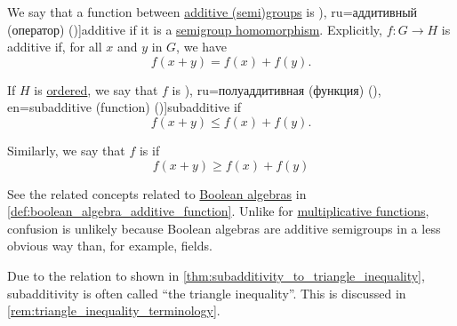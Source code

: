 \begin{definition}\label{def:additive_function}\mimprovised
  We say that a function between \hyperref[def:additive_semigroup]{additive (semi)groups} is \term[en=additive (function) (\cite[\S 8.17]{Schechter1997AnalysisHandbook}), ru=аддитивный (оператор) (\cite[395]{Хелемский2014ФункциональныйАнализ})]{additive} if it is a \hyperref[def:semigroup/morphism]{semigroup homomorphism}. Explicitly, \( f: G \to H \) is additive if, for all \( x \) and \( y \) in \( G \), we have
  \begin{equation}\label{eq:def:additive_function}
    f(x + y) = f(x) + f(y).
  \end{equation}

  \begin{thmenum}
     If \( H \) is \hyperref[def:ordered_semigroup]{ordered}, we say that \( f \) is \term[bg=полуадитивна (функция) (\cite[162]{Тагамлицки1978ИнтегралноСмятане}), ru=полуаддитивная (функция) (\cite[80]{КанторовичАкилов1984ФункциональныйАнализ}), en=subadditive (function) (\cite[\S 8.17]{Schechter1997AnalysisHandbook})]{subadditive} if
    \begin{equation}\label{eq:def:additive_function/sub}
      f(x + y) \leq f(x) + f(y).
    \end{equation}

     Similarly, we say that \( f \) is  if
    \begin{equation}\label{eq:def:additive_function/super}
      f(x + y) \geq f(x) + f(y)
    \end{equation}
  \end{thmenum}
\end{definition}
\begin{comments}
  \item See the related concepts related to \hyperref[def:boolean_algebra]{Boolean algebras} in \cref{def:boolean_algebra_additive_function}. Unlike for \hyperref[def:multiplicative_function]{multiplicative functions}, confusion is unlikely because Boolean algebras are additive semigroups in a less obvious way than, for example, fields.

  \item Due to the relation to  shown in \cref{thm:subadditivity_to_triangle_inequality}, subadditivity is often called \enquote{the triangle inequality}. This is discussed in \cref{rem:triangle_inequality_terminology}.
\end{comments}

